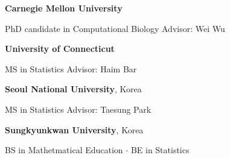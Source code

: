 \documentclass{tidycv} %
\begin{document}
\makecvheader


\begin{cveducations}
    {{\bf Carnegie Mellon University}} %
    {
    \begin{cveducationitems} %
        PhD candidate in Computational Biology \hfill Advisor: Wei Wu\\
	\end{cveducationitems}
    }
    {{\bf University of Connecticut}} %
    {
    \begin{cveducationitems} %
        MS in Statistics \hfill Advisor: Haim Bar\\
	\end{cveducationitems}
    }
    {{\bf Seoul National University}, Korea } %
    {
    \begin{cveducationitems} %
        MS in Statistics \hfill Advisor: Taesung Park\\
	\end{cveducationitems}
    }
    {{\bf Sungkyunkwan University}, Korea} %
    {
    \begin{cveducationitems} %
        BS in Mathetmatical Education $\cdot$ BE in Statistics\\
	\end{cveducationitems}
    }
\end{cveducations}
\end{document}
